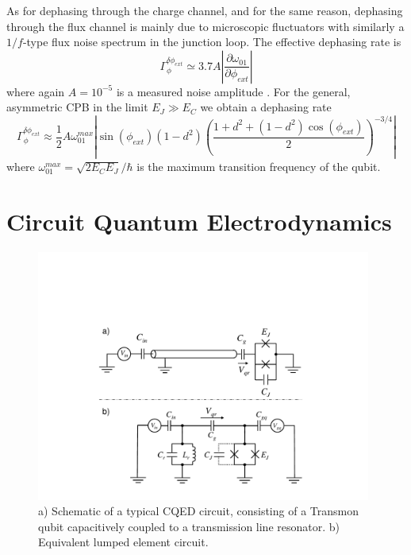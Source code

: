 As for dephasing through the charge channel, and for the same reason, dephasing through the flux channel is mainly due to microscopic fluctuators  
with similarly a $1/f$-type flux noise spectrum in the junction loop.  The  effective 	 dephasing rate is 
%
\begin{equation}
\Gamma_\phi^{\delta \phi_{ext}} \simeq 3.7A\left|\frac{\partial \omega_{01}}{\partial \phi_{ext}}\right| \label{eq:flux_dephasing_rate}
\end{equation}
%
where again $A=10^{-5}$ is a measured noise amplitude \citep{koch_charge-insensitive_2007}. For the general, asymmetric CPB in the limit $E_J \gg E_C$ we obtain a dephasing rate
%
\begin{equation}
\Gamma_\phi^{\delta \phi_{ext}} \approx \frac{1}{2} A \omega_{01}^{max}\left|\sin{(\phi_{ext})}(1-d^2)\left(\frac{1+d^2+(1-d^2)\cos{(\phi_{ext})}}{2}\right)^{-3/4}\right|
\end{equation}
%
where $\omega_{01}^{max}= \sqrt{2 E_C E_J}/\hbar$ is the maximum transition frequency of the qubit.

\section{Circuit Quantum Electrodynamics} \label{section:cqed}

\begin{figure}
	\includegraphics[width=11cm]{"./material/figures/introduction/cqed/cqed"}
	\caption{a) Schematic of a typical CQED circuit, consisting of a Transmon qubit capacitively coupled to a transmission line resonator. b) Equivalent lumped element circuit.}
	\label{fig:CQED}
\end{figure}

